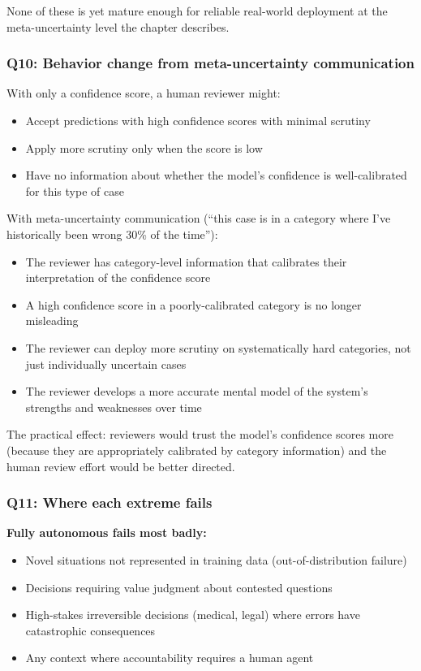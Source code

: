 None of these is yet mature enough for reliable real-world deployment at the meta-uncertainty level the chapter describes.

\subsubsection*{Q10: Behavior change from meta-uncertainty communication}

With only a confidence score, a human reviewer might:
\begin{itemize}
    \item Accept predictions with high confidence scores with minimal scrutiny
    \item Apply more scrutiny only when the score is low
    \item Have no information about whether the model's confidence is well-calibrated for this type of case
\end{itemize}

With meta-uncertainty communication (``this case is in a category where I've historically been wrong 30\% of the time''):
\begin{itemize}
    \item The reviewer has category-level information that calibrates their interpretation of the confidence score
    \item A high confidence score in a poorly-calibrated category is no longer misleading
    \item The reviewer can deploy more scrutiny on systematically hard categories, not just individually uncertain cases
    \item The reviewer develops a more accurate mental model of the system's strengths and weaknesses over time
\end{itemize}

The practical effect: reviewers would trust the model's confidence scores more (because they are appropriately calibrated by category information) and the human review effort would be better directed.

\subsubsection*{Q11: Where each extreme fails}

\textbf{Fully autonomous fails most badly:}
\begin{itemize}
    \item Novel situations not represented in training data (out-of-distribution failure)
    \item Decisions requiring value judgment about contested questions
    \item High-stakes irreversible decisions (medical, legal) where errors have catastrophic consequences
    \item Any context where accountability requires a human agent
\end{itemize}

